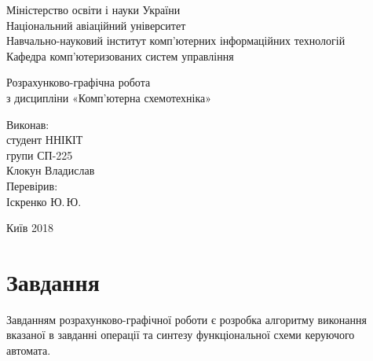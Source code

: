 \documentclass[
	a4paper,
	oneside,
	DIV = 12,
	12pt,
	headings = normal,
]{scrartcl}
\begin{document}
	\begin{titlepage}
		\begin{center}
			Міністерство освіти і науки України\\
			Національний авіаційний університет\\
			Навчально-науковий інститут комп'ютерних інформаційних технологій\\
			Кафедра комп'ютеризованих систем управління

			\vspace{\fill}
				Розрахунково-графічна робота\\
				з дисципліни «Комп'ютерна схемотехніка»\\

			\vspace{\fill}

			\begin{flushright}
				Виконав:\\
				студент ННІКІТ\\
				групи СП-225\\
				Клокун Владислав\\
				Перевірив:\\
				Іскренко Ю.\,Ю.
			\end{flushright}

			Київ 2018
		\end{center}
	\end{titlepage}

	\section{Завдання}
		Завданням розрахунково-графічної роботи є розробка алгоритму виконання вказаної в завданні операції та синтезу функціональної схеми керуючого автомата.
\end{document}
